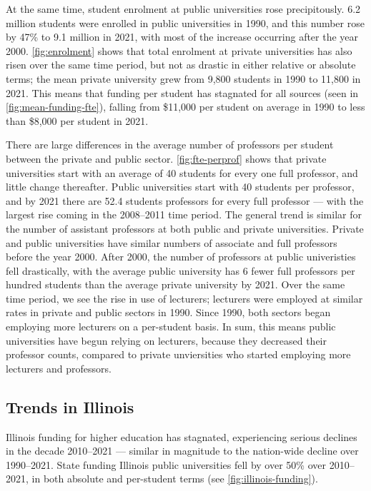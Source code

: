 At the same time, student enrolment at public universities rose precipitously.
6.2 million students were enrolled in public universities in 1990, and this number rose by 47\% to 9.1 million in 2021, with most of the increase occurring after the year 2000.
\autoref{fig:enrolment} shows that total enrolment at private universities has also risen over the same time period, but not as drastic in either relative or absolute terms; the mean private university grew from 9,800 students in 1990 to 11,800 in 2021.
This means that funding per student has stagnated for all sources (seen in \autoref{fig:mean-funding-fte}), falling from \$11,000 per student on average in 1990 to less than \$8,000 per student in 2021.

There are large differences in the average number of professors per student between the private and public sector.
\autoref{fig:fte-perprof} shows that private universities start with an average of 40 students for every one full professor, and little change thereafter.
Public universities start with 40 students per professor, and by 2021 there are 52.4 students professors for every full professor --- with the largest rise coming in the 2008--2011 time period.
The general trend is similar for the number of assistant professors at both public and private universities.
Private and public universities have similar numbers of associate and full professors before the year 2000.
After 2000, the number of professors at public univeristies fell drastically, with the average public university has 6 fewer full professors per hundred students than the average private university by 2021.
Over the same time period, we see the rise in use of lecturers; lecturers were employed at similar rates in private and public sectors in 1990.
Since 1990, both sectors began employing more lecturers on a per-student basis.
In sum, this means public universities have begun relying on lecturers, because they decreased their professor counts, compared to private unviersities who started employing more lecturers and professors.

\subsection{Trends in Illinois}
\label{sec:trends-illinois}
Illinois funding for higher education has stagnated, experiencing serious declines in the decade 2010--2021 --- similar in magnitude to the nation-wide decline over 1990--2021.
State funding Illinois public universities fell by over 50\% over 2010--2021, in both absolute and per-student terms (see \autoref{fig:illinois-funding}).

